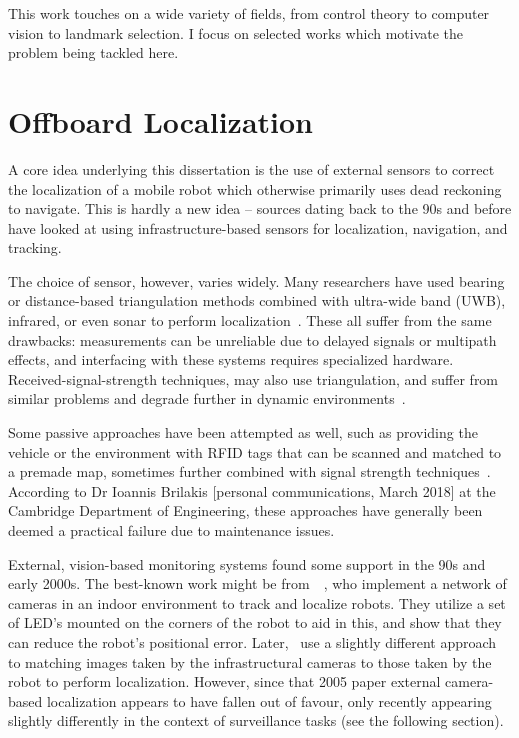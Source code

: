 \documentclass[a4paper,12pt,twoside,openright]{report}
\begin{document}

This work touches on a wide variety of fields, from control
theory to computer vision to landmark selection. I focus
on selected works which motivate the problem being tackled here.

\section{Offboard Localization}

A core idea underlying this dissertation is the use of
external sensors to correct the localization of a mobile robot which otherwise
primarily uses dead reckoning to navigate. 
This is hardly a new idea -- sources dating back to the 90s and before have looked at 
using infrastructure-based sensors for localization,
navigation, and tracking.

The choice of sensor, however, varies widely. Many researchers
have used bearing or distance-based triangulation methods combined
with ultra-wide band (UWB), infrared, or even sonar to perform localization~\cite{wang2010survey}. These all suffer
from the same drawbacks: measurements can be unreliable
due to delayed signals or multipath effects, and interfacing with 
these systems requires specialized hardware. Received-signal-strength techniques, 
may also use triangulation, and suffer from similar problems and
degrade further in dynamic environments~\cite{goldoni2010experimental}.

Some passive approaches have been attempted as well, such as
providing the vehicle or the environment with RFID tags that
can be scanned and matched to a premade map, sometimes 
further combined with signal strength techniques~\cite{bouet2008rfid}. According to 
Dr Ioannis Brilakis [personal communications, March 2018] at the Cambridge Department of Engineering,
these approaches have generally been deemed a practical failure due to 
maintenance issues. 

External, vision-based monitoring systems found some support
in the 90s and early 2000s. The best-known work might be
from~\citeauthor{kruse1998camera}~\cite{kruse1998camera}, who implement a network
of cameras in an indoor environment to track and localize robots.
They utilize a set of LED's mounted on the corners of the robot
to aid in this, and show that they can reduce the robot's
positional error. Later,~\citeauthor{menegatti2005distributed}\cite{menegatti2005distributed}
use a slightly different approach to matching images taken
by the infrastructural cameras to those taken by the robot to
perform localization. However, since that 2005 paper external 
camera-based localization appears to have fallen out of favour,
only recently appearing slightly differently
in the context of surveillance tasks (see the following section).
\end{document}
